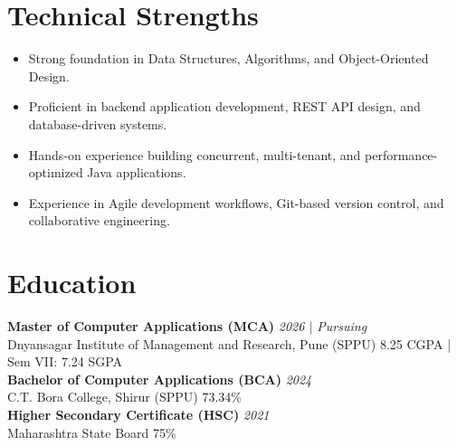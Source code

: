 \documentclass[10.5pt,a4paper]{article}
\begin{document}
\section{Technical Strengths}
\begin{itemize}
  \item Strong foundation in Data Structures, Algorithms, and Object-Oriented Design.
  \item Proficient in backend application development, REST API design, and database-driven systems.
  \item Hands-on experience building concurrent, multi-tenant, and performance-optimized Java applications.
  \item Experience in Agile development workflows, Git-based version control, and collaborative engineering.
\end{itemize}
\section{Education}
\textbf{Master of Computer Applications (MCA)} \hfill \textit{2026 $|$ Pursuing}\\
Dnyansagar Institute of Management and Research, Pune (SPPU) \hfill 8.25 CGPA | Sem VII: 7.24 SGPA\\[4pt]
\textbf{Bachelor of Computer Applications (BCA)} \hfill \textit{2024}\\
C.T. Bora College, Shirur (SPPU) \hfill 73.34\%\\[4pt]
\textbf{Higher Secondary Certificate (HSC)} \hfill \textit{2021}\\
Maharashtra State Board \hfill 75\%\\[4pt]
\end{document}
